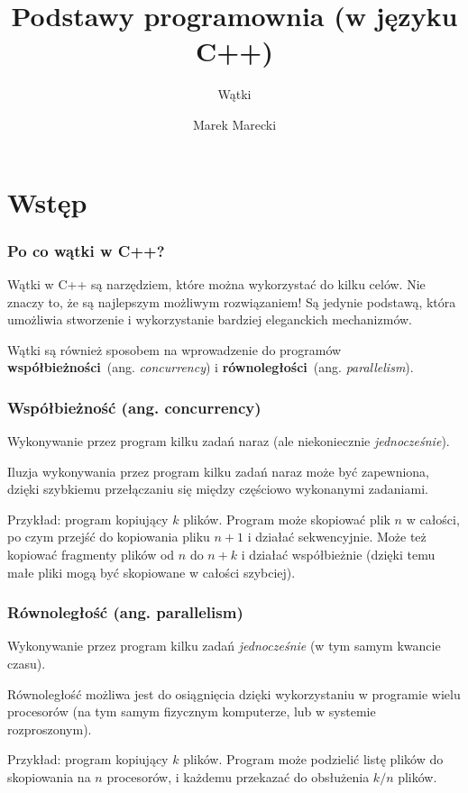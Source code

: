 \documentclass[aspectratio=169]{beamer}
\title{Podstawy programownia (w języku C++)}
\subtitle{Wątki}
\author{Marek Marecki}
\institute{Polsko-Japońska Akademia Technik Komputerowych}
\begin{document}
{%
    \frame{\titlepage}
}

\section{Wstęp}

\begin{frame}
    \frametitle{Po co wątki w C++?}

    Wątki w C++ są narzędziem, które można wykorzystać do kilku celów. Nie
    znaczy to, że są najlepszym możliwym rozwiązaniem! Są jedynie podstawą,
    która umożliwia stworzenie i wykorzystanie bardziej eleganckich mechanizmów.

    \vspace{1em}

    Wątki są również sposobem na wprowadzenie do programów
    \textbf{współbieżności}~(ang. \emph{concurrency}) i
    \textbf{równoległości}~(ang. \emph{parallelism}).
\end{frame}

\begin{frame}
    \frametitle{Współbieżność (ang. concurrency)}

    Wykonywanie przez program kilku zadań naraz (ale niekoniecznie
    \emph{jednocześnie}).

    \vspace{1em}

    Iluzja wykonywania przez program kilku zadań naraz może być zapewniona,
    dzięki szybkiemu przełączaniu się między częściowo wykonanymi zadaniami.

    \vspace{1em}

    Przykład: program kopiujący $k$ plików. Program może skopiować plik $n$ w
    całości, po czym przejść do kopiowania pliku $n+1$ i działać sekwencyjnie.
    Może też kopiować fragmenty plików od $n$ do $n+k$ i działać współbieżnie
    (dzięki temu małe pliki mogą być skopiowane w całości szybciej).
\end{frame}

\begin{frame}
    \frametitle{Równoległość (ang. parallelism)}

    Wykonywanie przez program kilku zadań \emph{jednocześnie} (w tym samym
    kwancie czasu).

    \vspace{1em}

    Równoległość możliwa jest do osiągnięcia dzięki wykorzystaniu w programie
    wielu procesorów (na tym samym fizycznym komputerze, lub w systemie
    rozproszonym).

    \vspace{1em}

    Przykład: program kopiujący $k$ plików. Program może podzielić listę plików
    do skopiowania na $n$ procesorów, i każdemu przekazać do obsłużenia $k/n$
    plików.
\end{frame}
\end{document}

